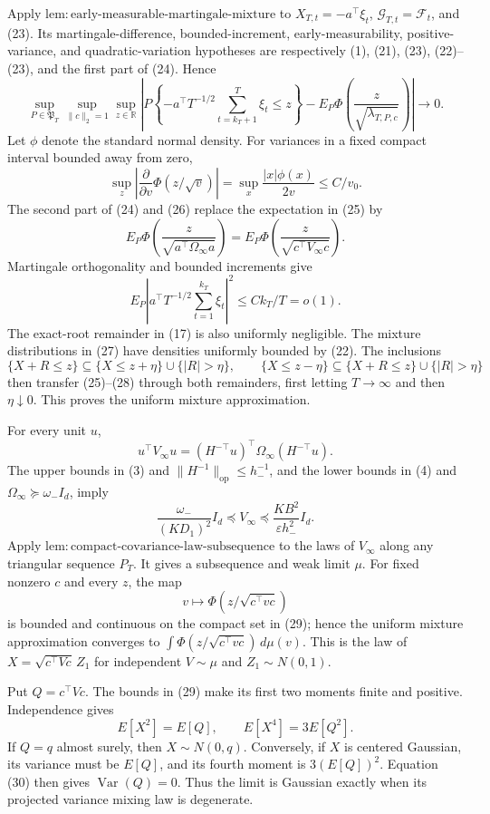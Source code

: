 Apply \(\mathrm{lem:early\text{-}measurable\text{-}martingale\text{-}mixture}\) to \(X_{T,t}=-a^\top\xi_t\), \(\mathcal G_{T,t}=\mathcal F_t\), and (23). Its martingale-difference, bounded-increment, early-measurability, positive-variance, and quadratic-variation hypotheses are respectively (1), (21), (23), (22)--(23), and the first part of (24). Hence
\[
 \sup_{P\in\mathfrak P_T}\sup_{\|c\|_2=1}\sup_{z\in\mathbb R}
 \left|P\left\{-a^\top T^{-1/2}\sum_{t=k_T+1}^T\xi_t\le z\right\}
 -E_P\Phi\left(\frac z{\sqrt{\lambda_{T,P,c}}}\right)\right|\to0. \tag{25}
\]
Let \(\phi\) denote the standard normal density. For variances in a fixed compact interval bounded away from zero,
\[
 \sup_z\left|\frac{\partial}{\partial v}\Phi(z/\sqrt v)\right|
 =\sup_x\frac{|x|\phi(x)}{2v}\le C/v_0. \tag{26}
\]
The second part of (24) and (26) replace the expectation in (25) by
\[
 E_P\Phi\left(\frac z{\sqrt{a^\top\Omega_\infty a}}\right)
 =E_P\Phi\left(\frac z{\sqrt{c^\top V_\infty c}}\right). \tag{27}
\]
Martingale orthogonality and bounded increments give
\[
 E_P\left|a^\top T^{-1/2}\sum_{t=1}^{k_T}\xi_t\right|^2
 \le Ck_T/T=o(1). \tag{28}
\]
The exact-root remainder in (17) is also uniformly negligible. The mixture distributions in (27) have densities uniformly bounded by (22). The inclusions
\[
 \{X+R\le z\}\subseteq\{X\le z+\eta\}\cup\{|R|>\eta\},
 \qquad
 \{X\le z-\eta\}\subseteq\{X+R\le z\}\cup\{|R|>\eta\}
\]
then transfer (25)--(28) through both remainders, first letting \(T\to\infty\) and then \(\eta\downarrow0\). This proves the uniform mixture approximation.

For every unit \(u\),
\[
 u^\top V_\infty u=(H^{-\top}u)^\top\Omega_\infty(H^{-\top}u).
\]
The upper bounds in (3) and \(\|H^{-1}\|_{\mathrm{op}}\le h_-^{-1}\), and the lower bounds in (4) and \(\Omega_\infty\succeq\omega_-I_d\), imply
\[
 \frac{\omega_-}{(KD_1)^2}I_d\preceq V_\infty
 \preceq\frac{KB^2}{\varepsilon h_-^2}I_d. \tag{29}
\]
Apply \(\mathrm{lem:compact\text{-}covariance\text{-}law\text{-}subsequence}\) to the laws of \(V_\infty\) along any triangular sequence \(P_T\). It gives a subsequence and weak limit \(\mu\). For fixed nonzero \(c\) and every \(z\), the map
\[
 v\longmapsto\Phi\left(z/\sqrt{c^\top vc}\right)
\]
is bounded and continuous on the compact set in (29); hence the uniform mixture approximation converges to \(\int\Phi(z/\sqrt{c^\top vc})\,d\mu(v)\). This is the law of \(X=\sqrt{c^\top Vc}\,Z_1\) for independent \(V\sim\mu\) and \(Z_1\sim N(0,1)\).

Put \(Q=c^\top Vc\). The bounds in (29) make its first two moments finite and positive. Independence gives
\[
 E[X^2]=E[Q],\qquad E[X^4]=3E[Q^2]. \tag{30}
\]
If \(Q=q\) almost surely, then \(X\sim N(0,q)\). Conversely, if \(X\) is centered Gaussian, its variance must be \(E[Q]\), and its fourth moment is \(3(E[Q])^2\). Equation (30) then gives \(\operatorname{Var}(Q)=0\). Thus the limit is Gaussian exactly when its projected variance mixing law is degenerate.

